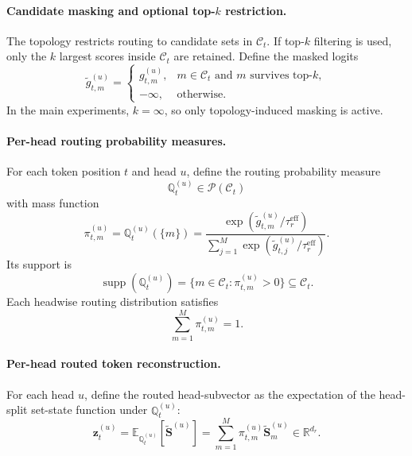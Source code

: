 \documentclass{article}
\theoremstyle{plain}
\theoremstyle{definition}
\theoremstyle{remark}
\begin{document}
\paragraph{Candidate masking and optional top-$k$ restriction.}
The topology restricts routing to candidate sets in $\mathcal C_t$. If top-$k$ filtering is used, only the $k$ largest scores inside $\mathcal C_t$ are retained. Define the masked logits
\begin{equation}
\label{eq:masked-logits}
\widetilde g^{(u)}_{t,m}=
\begin{cases}
g^{(u)}_{t,m},& m\in\mathcal C_t \text{ and } m \text{ survives top-}k,\\
-\infty,& \text{otherwise}.
\end{cases}
\end{equation}
In the main experiments, $k=\infty$, so only topology-induced masking is active.

\paragraph{Per-head routing probability measures.}
For each token position $t$ and head $u$, define the routing probability measure
\begin{equation}
\label{eq:routing-probability-measure}
\mathbb Q_t^{(u)}\in\mathcal P(\mathcal C_t)
\end{equation}
with mass function
\begin{equation}
\label{eq:routing-probabilities}
\pi_{t,m}^{(u)}=\mathbb Q_t^{(u)}(\{m\})
=
\frac{\exp(\widetilde g^{(u)}_{t,m}/\tau_r^{\mathrm{eff}})}{\sum_{j=1}^M \exp(\widetilde g^{(u)}_{t,j}/\tau_r^{\mathrm{eff}})}.
\end{equation}
Its support is
\begin{equation}
\label{eq:routing-support}
\operatorname{supp}(\mathbb Q_t^{(u)})
=
\{m\in\mathcal C_t: \pi_{t,m}^{(u)}>0\}
\subseteq \mathcal C_t.
\end{equation}
Each headwise routing distribution satisfies
\begin{equation}
\label{eq:routing-prob-sum}
\sum_{m=1}^M \pi_{t,m}^{(u)}=1.
\end{equation}

\paragraph{Per-head routed token reconstruction.}
For each head $u$, define the routed head-subvector as the expectation of the head-split set-state function under $\mathbb Q_t^{(u)}$:
\begin{equation}
\label{eq:per-head-routed}
\mathbf z_t^{(u)}
=
\mathbb E_{\mathbb Q_t^{(u)}}[\widetilde{\mathbf S}^{(u)}]
=
\sum_{m=1}^M \pi_{t,m}^{(u)}\widetilde{\mathbf S}^{(u)}_m
\in\mathbb R^{d_r}.
\end{equation}
\end{document}
